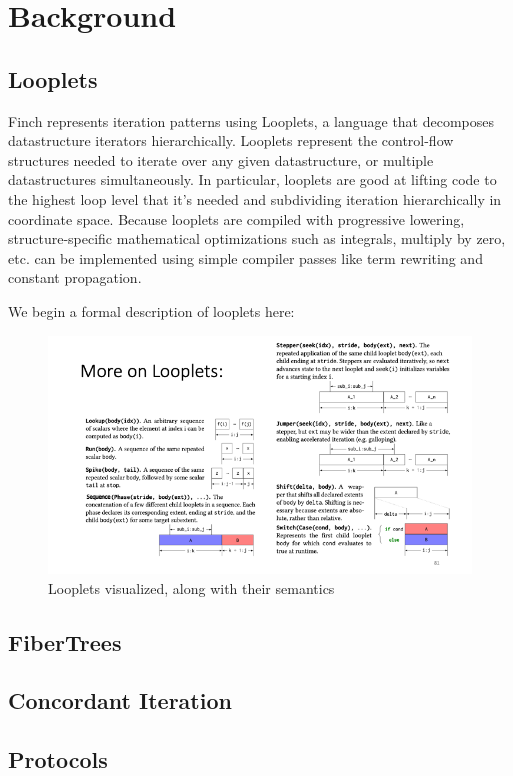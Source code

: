 \section{Background}
\subsection{Looplets}
Finch represents iteration patterns using Looplets, a language that decomposes datastructure iterators hierarchically. Looplets represent the control-flow structures needed to iterate over any given datastructure, or multiple datastructures simultaneously. In particular, looplets are good at lifting code to the highest loop level that it's needed and subdividing iteration hierarchically in coordinate space. Because looplets are compiled with progressive lowering, structure-specific mathematical optimizations such as integrals, multiply by zero, etc. can be implemented using simple compiler passes like term rewriting and constant propagation.

We begin a formal description of looplets here:

\begin{figure}
	\includegraphics[width=\linewidth]{example_looplet_figure.png}
    \caption{Looplets visualized, along with their semantics}
\end{figure}

\subsection{FiberTrees}

\subsection{Concordant Iteration}

\subsection{Protocols}